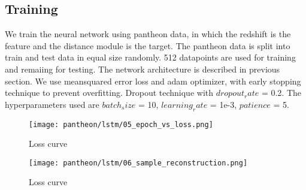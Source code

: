 \subsection{Training}
We train the neural network using pantheon data, in which the redshift is the feature and the distance module is the target. The pantheon data is split into train and test data in equal size randomly. 512 datapoints are used for training and remaiing for testing. The network architecture is described in previous section. We use meansquared error loss and adam optimizer, with early stopping technique to prevent overfitting. Dropout technique with $dropout_rate$ = 0.2. The hyperparameters used are $batch_size$ = 10, $learning_rate$ = 1e-3, $patience$ = 5.
\begin{figure}[H]
	\centering
	\texttt{[image: pantheon/lstm/05\_epoch\_vs\_loss.png]}
	\caption{Loss curve}
	\label{fig:loss_curve}
\end{figure}
\begin{figure}[H]
	\centering
	\texttt{[image: pantheon/lstm/06\_sample\_reconstruction.png]}
	\caption{Loss curve}
	\label{fig:reconstruction}
\end{figure}